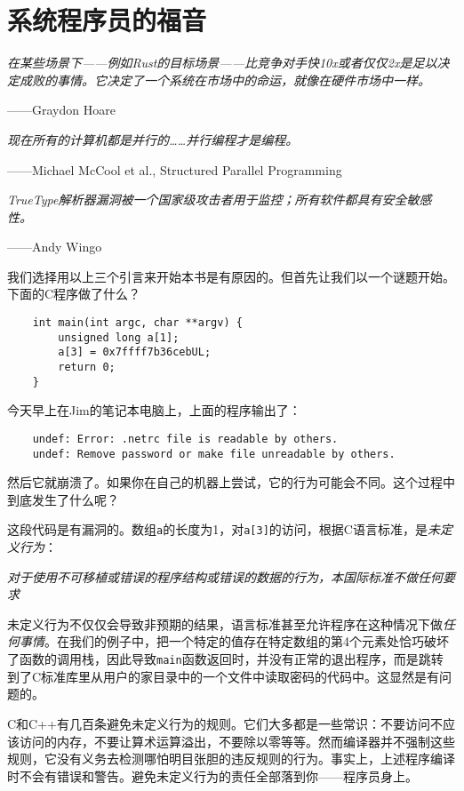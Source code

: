 \chapter{系统程序员的福音}\label{ch01}
\emph{在某些场景下——例如Rust的目标场景——比竞争对手快10x或者仅仅2x是足以决定成败的事情。它决定了一个系统在市场中的命运，就像在硬件市场中一样。}
\begin{flushright}
    ——Graydon Hoare
\end{flushright}

\emph{现在所有的计算机都是并行的……并行编程才是编程。}
\begin{flushright}
    ——Michael McCool et al., Structured Parallel Programming    
\end{flushright}

\emph{TrueType解析器漏洞被一个国家级攻击者用于监控；所有软件都具有安全敏感性。}
\begin{flushright}
    ——Andy Wingo
\end{flushright}

我们选择用以上三个引言来开始本书是有原因的。但首先让我们以一个谜题开始。下面的C程序做了什么？
\begin{verbatim}
    int main(int argc, char **argv) {
        unsigned long a[1];
        a[3] = 0x7ffff7b36cebUL;
        return 0;
    }
\end{verbatim}

今天早上在Jim的笔记本电脑上，上面的程序输出了：
\begin{verbatim}
    undef: Error: .netrc file is readable by others.
    undef: Remove password or make file unreadable by others.
\end{verbatim}
然后它就崩溃了。如果你在自己的机器上尝试，它的行为可能会不同。这个过程中到底发生了什么呢？

这段代码是有漏洞的。数组\texttt{a}的长度为1，对\texttt{a[3]}的访问，根据C语言标准，是\emph{未定义行为}：

\emph{对于使用不可移植或错误的程序结构或错误的数据的行为，本国际标准不做任何要求}

未定义行为不仅仅会导致非预期的结果，语言标准甚至允许程序在这种情况下做\emph{任何事情}。在我们的例子中，把一个特定的值存在特定数组的第4个元素处恰巧破坏了函数的调用栈，因此导致\texttt{main}函数返回时，并没有正常的退出程序，而是跳转到了C标准库里从用户的家目录中的一个文件中读取密码的代码中。这显然是有问题的。

C和C++有几百条避免未定义行为的规则。它们大多都是一些常识：不要访问不应该访问的内存，不要让算术运算溢出，不要除以零等等。然而编译器并不强制这些规则，它没有义务去检测哪怕明目张胆的违反规则的行为。事实上，上述程序编译时不会有错误和警告。避免未定义行为的责任全部落到你——程序员身上。

